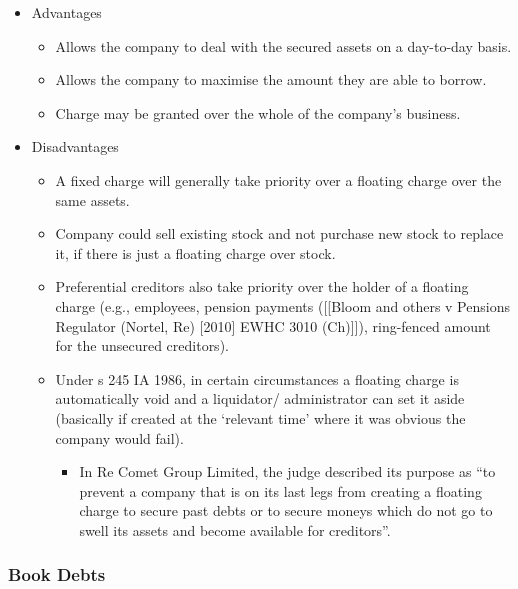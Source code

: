 \documentclass[
]{article}
\providecommand{\tightlist}{%
  \setlength{\itemsep}{0pt}\setlength{\parskip}{0pt}}
\begin{document}
\begin{itemize}
\tightlist
\item
  Advantages

  \begin{itemize}
  \tightlist
  \item
    Allows the company to deal with the secured assets on a day-to-day
    basis.
  \item
    Allows the company to maximise the amount they are able to borrow.
  \item
    Charge may be granted over the whole of the company's business.
  \end{itemize}
\item
  Disadvantages

  \begin{itemize}
  \tightlist
  \item
    A fixed charge will generally take priority over a floating charge
    over the same assets.
  \item
    Company could sell existing stock and not purchase new stock to
    replace it, if there is just a floating charge over stock.
  \item
    Preferential creditors also take priority over the holder of a
    floating charge (e.g., employees, pension payments ({[}{[}Bloom and
    others v Pensions Regulator (Nortel, Re) {[}2010{]} EWHC 3010
    (Ch){]}{]}), ring-fenced amount for the unsecured creditors).
  \item
    Under s 245 IA 1986, in certain circumstances a floating charge is
    automatically void and a liquidator/ administrator can set it aside
    (basically if created at the `relevant time' where it was obvious
    the company would fail).

    \begin{itemize}
    \tightlist
    \item
      In Re Comet Group Limited, the judge described its purpose as ``to
      prevent a company that is on its last legs from creating a
      floating charge to secure past debts or to secure moneys which do
      not go to swell its assets and become available for creditors''.
    \end{itemize}
  \end{itemize}
\end{itemize}

\hypertarget{book-debts}{%
\subsubsection{Book Debts}\label{book-debts}}
\end{document}
